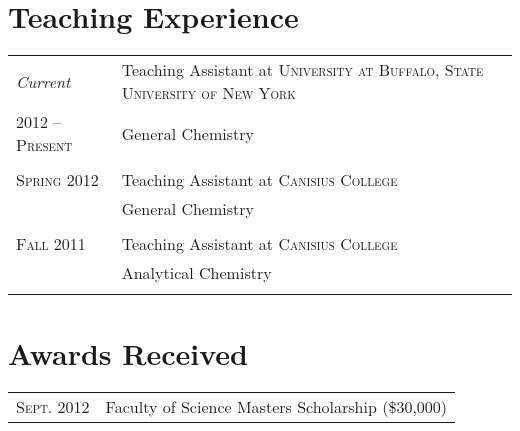 \documentclass[letterpaper,10pt]{article} %
\begin{document}
\section{Teaching Experience}
\noindent 
\begin{tabular}{R{3cm}|p{13cm}} 

\emph{Current} & Teaching Assistant at \textsc{University at Buffalo, State University of New York}\\
\textsc{2012 -- Present} & \small General Chemistry\\
 \\


\textsc{Spring 2012} & Teaching Assistant at \textsc{Canisius College}\\
& \small General Chemistry\\
 \\


\textsc{Fall 2011} & Teaching Assistant at \textsc{Canisius College}\\
& \small Analytical Chemistry\\
 \\

\end{tabular}




\section{Awards Received}
\noindent 
\begin{tabular}{R{3cm}|p{13cm}} 

\textsc{Sept.} 2012 & Faculty of Science Masters Scholarship \footnotesize(\$30,000)\normalsize\\

\end{tabular}



\end{document}
